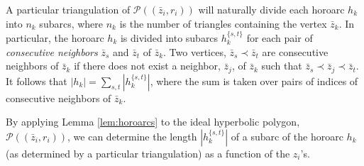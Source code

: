 \documentclass[10pt,a4paper]{article}
\newcommand{\h}[2]{h_{#1}^{\{#2\}}}
\newcommand{\z}[1]{\bar{z}_{#1}}
\newcommand{\len}[1]{\left\lvert #1 \right\rvert}
\begin{document}
A particular triangulation of $\mathcal{P}((\z{i},r_i))$ will naturally divide each horoarc $h_k$ into $n_k$ subarcs, where $n_k$ is the number of triangles containing the vertex $\z{k}$.  In particular, the horoarc $h_k$ is divided into subarcs $\h{k}{s,t}$ for each pair of \textit{consecutive neighbors} $\z{s}$ and $\z{t}$ of $\z{k}$. Two vertices, $\z{s} \prec \z{t}$ are consecutive neighbors of $\z{k}$ if there does not exist a neighbor, $\z{j}$, of $\z{k}$ such that $\z{s} \prec \z{j} \prec \z{t}$. It follows that $\len{h_k} = \sum_{s,t} \len{\h{k}{s,t}}$, where the sum is taken over pairs of indices of consecutive neighbors of $\z{k}$.

By applying Lemma \ref{lem:horoarcs} to the ideal hyperbolic polygon, $\mathcal{P}((\z{i},r_i))$, we can determine the length $\len{\h{k}{s,t}}$ of a subarc of the horoarc $h_k$ (as determined by a particular triangulation) as a function of the $z_i$'s.
\end{document}
